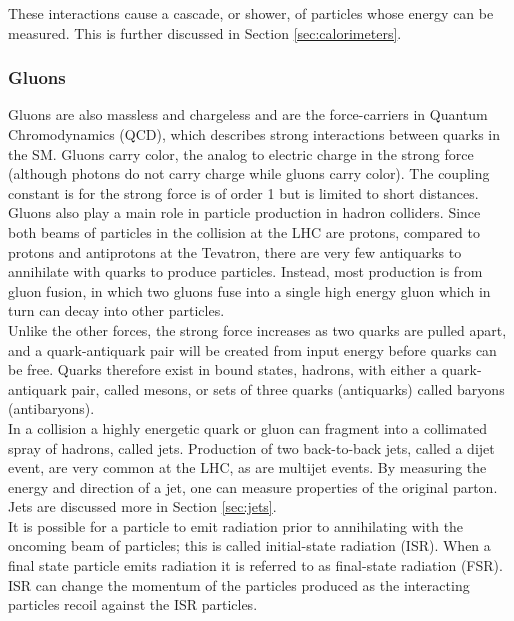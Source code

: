	These interactions cause a cascade, or shower, of particles whose energy can be measured.  This is further discussed in Section \ref{sec:calorimeters}. \\
	
	\subsubsection{Gluons}
	
	Gluons are also massless and chargeless and are the force-carriers in Quantum Chromodynamics (QCD), which describes strong interactions between quarks in the SM.  Gluons carry color, the analog to electric charge in the strong force (although photons do not carry charge while gluons carry color).  The coupling constant is for the strong force is of order 1 but is limited to short distances.  \\ %
	
	Gluons also play a main role in particle production in hadron colliders.  Since both beams of particles in the collision at the LHC are protons, compared to protons and antiprotons at the Tevatron, there are very few antiquarks to annihilate with quarks to produce particles.  Instead, most production is from gluon fusion, in which two gluons fuse into a single high energy gluon which in turn can decay into other particles. \\%
	
	Unlike the other forces, the strong force increases as two quarks are pulled apart, and a quark-antiquark pair will be created from input energy before quarks can be free.  Quarks therefore exist in bound states, hadrons, with either a quark-antiquark pair, called mesons, or sets of three quarks (antiquarks) called baryons (antibaryons).  \\
	
	In a collision a highly energetic quark or gluon can fragment into a collimated spray of hadrons, called jets.  Production of two back-to-back jets, called a dijet event, are very common at the LHC, as are multijet events.  By measuring the energy and direction of a jet, one can measure properties of the original parton.  Jets are discussed more in Section \ref{sec:jets}.  \\
	
	It is possible for a particle to emit radiation prior to annihilating with the oncoming beam of particles; this is called initial-state radiation (ISR).  When a final state particle emits radiation it is referred to as final-state radiation (FSR).  ISR can change the momentum of the particles produced as the interacting particles recoil against the ISR particles.   \\
	
